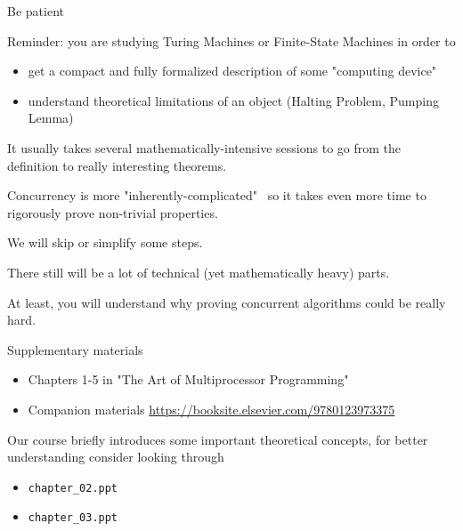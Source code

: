 \begin{frame}{Be patient}

Reminder: you are studying Turing Machines or Finite-State Machines in order to
\begin{itemize}
  \item get a compact and fully formalized description of some "computing device"
  \item understand theoretical limitations of an object (Halting Problem, Pumping Lemma)
\end{itemize}

\pause

It usually takes several mathematically-intensive sessions to go from the definition to really interesting theorems.

\pause

Concurrency is more "inherently-complicated" \ so it takes even more time to rigorously prove non-trivial properties. 

\pause

We will skip or simplify some steps.

\pause
There still will be a lot of technical (yet mathematically heavy) parts. 

\pause
At least, you will understand why proving concurrent algorithms could be really hard. 

\end{frame}

\begin{frame}{Supplementary materials}

\begin{itemize}
  \item Chapters 1-5 in "The Art of Multiprocessor Programming" 
  \item Companion materials \url{https://booksite.elsevier.com/9780123973375}
\end{itemize}

Our course briefly introduces some important theoretical concepts, for better understanding consider looking through
\begin{itemize}
  \item \texttt{chapter\_02.ppt}
  \item \texttt{chapter\_03.ppt}  
\end{itemize}

\end{frame}


